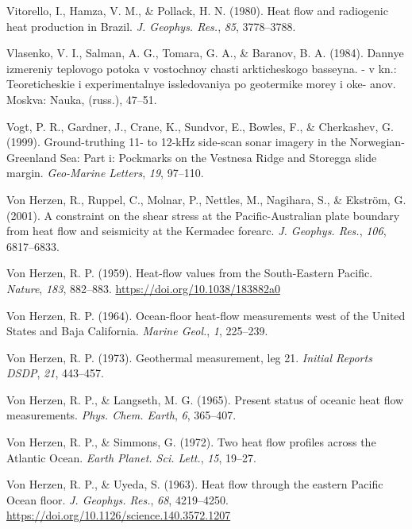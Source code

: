\begin{CSLReferences}{1}{1}
\leavevmode{}%
Vitorello, I., Hamza, V. M., \& Pollack, H. N. (1980). Heat flow and radiogenic heat production in {Brazil}. \emph{J. Geophys. Res.}, \emph{85}, 3778--3788.

\leavevmode{}%
Vlasenko, V. I., Salman, A. G., Tomara, G. A., \& Baranov, B. A. (1984). Dannye izmereniy teplovogo potoka v vostochnoy chasti arkticheskogo basseyna. - v kn.: Teoreticheskie i experimentalnye issledovaniya po geotermike morey i oke- anov. Moskva: Nauka, (russ.), 47--51.

\leavevmode{}%
Vogt, P. R., Gardner, J., Crane, K., Sundvor, E., Bowles, F., \& Cherkashev, G. (1999). Ground-truthing 11- to 12-kHz side-scan sonar imagery in the {Norwegian-Greenland Sea}: Part i: Pockmarks on the {Vestnesa Ridge and Storegga} slide margin. \emph{Geo-Marine Letters}, \emph{19}, 97--110.

\leavevmode{}%
Von Herzen, R., Ruppel, C., Molnar, P., Nettles, M., Nagihara, S., \& Ekström, G. (2001). A constraint on the shear stress at the {Pacific-Australian} plate boundary from heat flow and seismicity at the {Kermadec} forearc. \emph{J. Geophys. Res.}, \emph{106}, 6817--6833.

\leavevmode{}%
Von Herzen, R. P. (1959). Heat-flow values from the {South-Eastern Pacific}. \emph{Nature}, \emph{183}, 882--883. \url{https://doi.org/10.1038/183882a0}

\leavevmode{}%
Von Herzen, R. P. (1964). Ocean-floor heat-flow measurements west of the {United States and Baja California}. \emph{Marine Geol.}, \emph{1}, 225--239.

\leavevmode{}%
Von Herzen, R. P. (1973). Geothermal measurement, leg 21. \emph{Initial Reports DSDP}, \emph{21}, 443--457.

\leavevmode{}%
Von Herzen, R. P., \& Langseth, M. G. (1965). Present status of oceanic heat flow measurements. \emph{Phys. Chem. Earth}, \emph{6}, 365--407.

\leavevmode{}%
Von Herzen, R. P., \& Simmons, G. (1972). Two heat flow profiles across the {Atlantic Ocean}. \emph{Earth Planet. Sci. Lett.}, \emph{15}, 19--27.

\leavevmode{}%
Von Herzen, R. P., \& Uyeda, S. (1963). Heat flow through the eastern {Pacific Ocean} floor. \emph{J. Geophys. Res.}, \emph{68}, 4219--4250. \url{https://doi.org/10.1126/science.140.3572.1207}


\end{CSLReferences}
